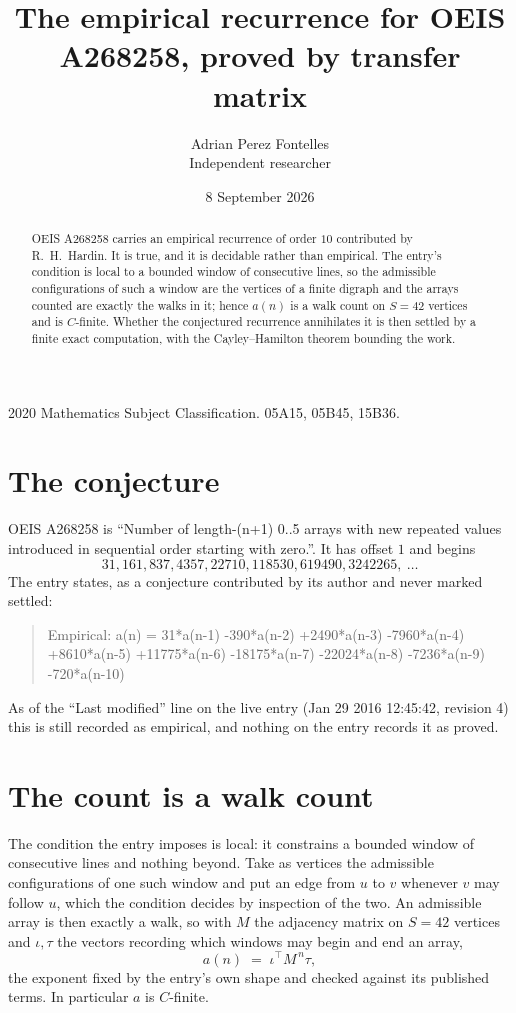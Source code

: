 \documentclass[11pt,a4paper]{article}
\title{The empirical recurrence for OEIS A268258, proved by transfer matrix}
\author{Adrian Perez Fontelles\\ \small Independent researcher}
\date{8 September 2026}
\theoremstyle{plain}
\theoremstyle{definition}
\begin{document}
\maketitle

\begin{abstract}
OEIS A268258 carries an empirical recurrence of order $10$ contributed by R.~H.~Hardin. It is
true, and it is decidable rather than empirical. The entry's condition is local to a bounded window of consecutive lines, so
the admissible configurations of such a window are the vertices of a finite digraph and the
arrays counted are exactly the walks in it; hence $a(n)$ is a walk count on $S=42$ vertices
and is $C$-finite. Whether the conjectured recurrence annihilates it is then settled by a
finite exact computation, with the Cayley--Hamilton theorem bounding the work.
\end{abstract}

\noindent\small 2020 Mathematics Subject Classification. 05A15, 05B45, 15B36.\normalsize

\section{The conjecture}

OEIS A268258 is ``Number of length-(n+1) 0..5 arrays with new repeated values introduced in sequential order starting with zero.''. It has offset $1$ and begins
\[
31, 161, 837, 4357, 22710, 118530, 619490, 3242265,\ \dots
\]
The entry states, as a conjecture contributed by its author and never marked settled:
\begin{quote}
Empirical: a(n) = 31*a(n-1) -390*a(n-2) +2490*a(n-3) -7960*a(n-4) +8610*a(n-5) +11775*a(n-6) -18175*a(n-7) -22024*a(n-8) -7236*a(n-9) -720*a(n-10)
\end{quote}
As of the ``Last modified'' line on the live entry (Jan 29 2016 12:45:42, revision 4) this is still
recorded as empirical, and nothing on the entry records it as proved.

\section{The count is a walk count}

The condition the entry imposes is local: it constrains a bounded window of consecutive lines and nothing beyond. Take as
vertices the admissible configurations of one such window and put an edge from $u$ to $v$
whenever $v$ may follow $u$, which the condition decides by inspection of the two. An
admissible array is then exactly a walk, so with $M$ the adjacency matrix on $S=42$ vertices
and $\iota,\tau$ the vectors recording which windows may begin and end an array,
\[
a(n)\;=\;\iota^{\!\top}M^{\,n}\tau ,
\]
the exponent fixed by the entry's own shape and checked against its published terms. In
particular $a$ is $C$-finite.
\end{document}

